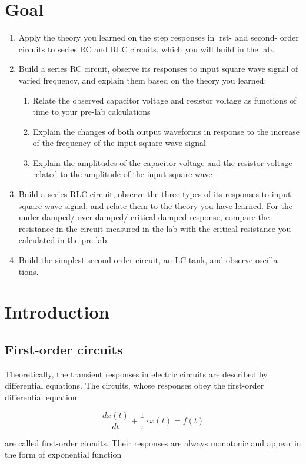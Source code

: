 \documentclass{article}
\begin{document}
\section{Goal}
\begin{enumerate}
\item
Apply the theory you learned on the step responses in rst- and second-
order circuits to series RC and RLC circuits, which you will build in the lab.
\item
Build a series RC circuit, observe its responses to input square wave
signal of varied frequency, and explain them based on the theory you learned:
\begin{enumerate}[$\bullet$]
\item
Relate the observed capacitor voltage and resistor voltage as functions of
time to your pre-lab calculations
\item
Explain the changes of both output waveforms in response to the increase
of the frequency of the input square wave signal
\item
Explain the amplitudes of the capacitor voltage and the resistor voltage
related to the amplitude of the input square wave
\end{enumerate}
\item
Build a series RLC circuit, observe the three types of its responses to input
square wave signal, and relate them to the theory you have learned. For the
under-damped/ over-damped/ critical damped response, compare the resistance
in the circuit measured in the lab with the critical resistance you calculated in
the pre-lab.
\item
Build the simplest second-order circuit, an LC tank, and observe oscilla-
tions.
\end{enumerate}

\section{Introduction}

\subsection{First-order circuits}
Theoretically, the transient responses in electric circuits are described by
differential equations. The circuits, whose responses obey the first-order differential equation

$$\frac{dx(t)}{dt}+\frac{1}{\tau}\cdot x(t)=f(t)$$

are called first-order circuits. Their responses are always monotonic and
appear in the form of exponential function
\end{document}
